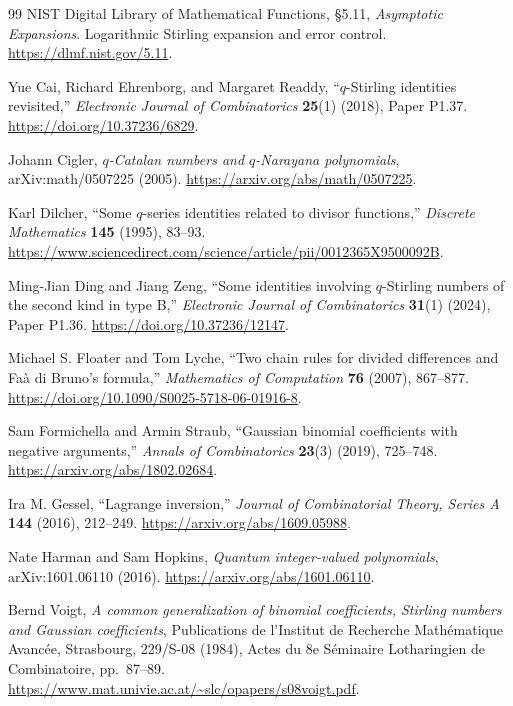 \documentclass[11pt,a4paper,oneside,openany]{book}
\theoremstyle{definition}
\theoremstyle{remark}
\begin{document}
\begin{thebibliography}{99}
NIST Digital Library of Mathematical Functions, \S5.11,
\emph{Asymptotic Expansions}. Logarithmic Stirling expansion and error
control.
\url{https://dlmf.nist.gov/5.11}.

Yue Cai, Richard Ehrenborg, and Margaret Readdy,
``\(q\)-Stirling identities revisited,''
\emph{Electronic Journal of Combinatorics} \textbf{25}(1) (2018), Paper P1.37.
\url{https://doi.org/10.37236/6829}.

Johann Cigler,
\emph{\(q\)-Catalan numbers and \(q\)-Narayana polynomials},
arXiv:math/0507225 (2005).
\url{https://arxiv.org/abs/math/0507225}.

Karl Dilcher, ``Some \(q\)-series identities related to divisor functions,''
\emph{Discrete Mathematics} \textbf{145} (1995), 83--93.
\url{https://www.sciencedirect.com/science/article/pii/0012365X9500092B}.

Ming-Jian Ding and Jiang Zeng,
``Some identities involving \(q\)-Stirling numbers of the second kind in
type B,'' \emph{Electronic Journal of Combinatorics} \textbf{31}(1) (2024),
Paper P1.36.
\url{https://doi.org/10.37236/12147}.

Michael S. Floater and Tom Lyche,
``Two chain rules for divided differences and Fa\`a di Bruno's formula,''
\emph{Mathematics of Computation} \textbf{76} (2007), 867--877.
\url{https://doi.org/10.1090/S0025-5718-06-01916-8}.

Sam Formichella and Armin Straub,
``Gaussian binomial coefficients with negative arguments,''
\emph{Annals of Combinatorics} \textbf{23}(3) (2019), 725--748.
\url{https://arxiv.org/abs/1802.02684}.

Ira M. Gessel, ``Lagrange inversion,''
\emph{Journal of Combinatorial Theory, Series A} \textbf{144} (2016), 212--249.
\url{https://arxiv.org/abs/1609.05988}.

Nate Harman and Sam Hopkins,
\emph{Quantum integer-valued polynomials},
arXiv:1601.06110 (2016).
\url{https://arxiv.org/abs/1601.06110}.

Bernd Voigt,
\emph{A common generalization of binomial coefficients, Stirling numbers
and Gaussian coefficients},
Publications de l'Institut de Recherche Math\'ematique Avanc\'ee,
Strasbourg, 229/S-08 (1984), Actes du 8e S\'eminaire Lotharingien de
Combinatoire, pp.~87--89.
\url{https://www.mat.univie.ac.at/~slc/opapers/s08voigt.pdf}.

\end{thebibliography}
\end{document}
